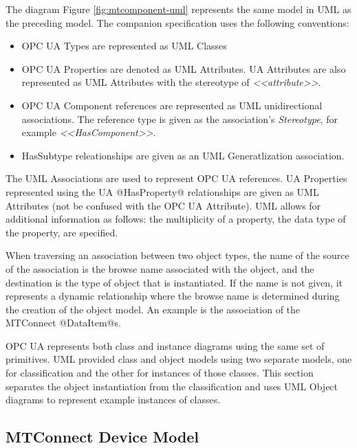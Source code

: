 The diagram Figure \ref{fig:mtcomponent-uml} represents the same model in UML as the preceding model. The companion specification uses the following conventions:

\begin{itemize}
\item OPC UA Types are represented as UML Classes
\item OPC UA Properties are denoted as UML Attributes. UA Attributes are also represented as UML Attributes with the stereotype of \textit{<<attribute>>}.
\item OPC UA Component references are represented as UML unidirectional associations. The reference type is given as the association's \textit{Stereotype}, for example \textit{<<HasComponent>>}. 
\item HasSubtype releationships are given as an UML Generatlization association.  
\end{itemize}

The UML Associations are used to represent OPC UA references. UA Properties represented using the UA @Has\-Property@ relationships are given as UML Attributes (not be confused with the OPC UA Attribute). UML allows for additional information as follows:  the multiplicity of a property, the data type of the property, are specified.



When traversing an association between two object types, the name of the source of the association is the browse name associated with the object, and the destination is the type of object that is instantiated. If the name is not given, it represents a dynamic relationship where the browse name is determined during the creation of the object model. An example is the association of the MTConnect @DataItem@s.

OPC UA represents both class and instance diagrams using the same set of primitives. UML provided class and object models using two separate models, one for classification and the other for instances of those classes. This section separates the object instantiation from the classification and uses UML Object diagrams to represent example instances of classes.

\FloatBarrier

\subsection{MTConnect Device Model}

